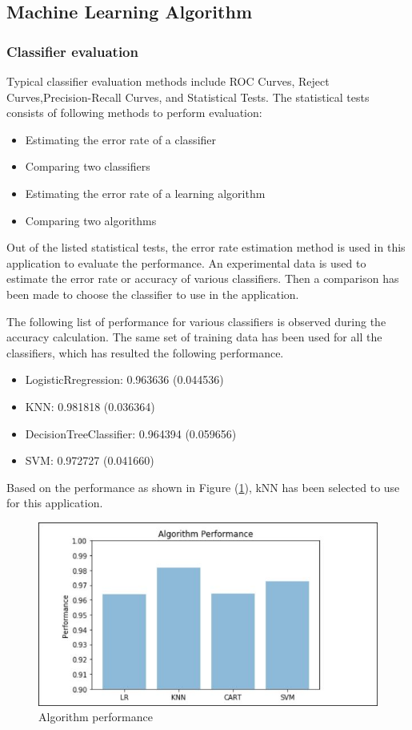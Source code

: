 \documentclass[sigconf]{acmart}
\begin{document}
\subsection{Machine Learning Algorithm}
\subsubsection{Classifier evaluation}
Typical classifier evaluation methods include ROC Curves, Reject Curves,Precision-Recall Curves, and Statistical Tests. The statistical tests consists of following methods to perform evaluation:
\begin{itemize}
    \item Estimating the error rate of a classifier
    \item Comparing two classifiers
    \item Estimating the error rate of a learning algorithm
    \item Comparing two algorithms
\end{itemize}

Out of the listed statistical tests, the error rate estimation method is used in this application to evaluate the performance. An experimental data is used to estimate the error rate or accuracy of various classifiers. Then a comparison has been made to choose the classifier to use in the application.

The following list of performance for various classifiers is observed during the accuracy calculation. The same set of training data has been used for all the classifiers, which has resulted the following performance.
\begin{itemize}
\item LogisticRregression: 0.963636 (0.044536)
\item KNN: 0.981818 (0.036364)
\item DecisionTreeClassifier: 0.964394 (0.059656)
\item SVM: 0.972727 (0.041660)
\end{itemize}

Based on the performance as shown in Figure (\ref{fig:Figure4}), kNN has been selected to use for this application. 

\begin{figure}
\includegraphics[width=1.0\columnwidth]{images/algperformance}
\caption{Algorithm performance} \label{fig:Figure4}
\end{figure}
\end{document}
